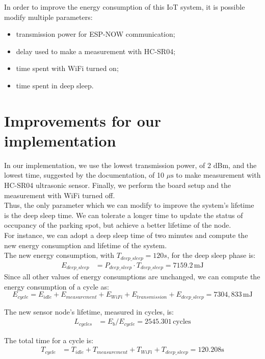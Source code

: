 In order to improve the energy consumption of this IoT system, it is possible modify multiple parameters:
\begin{itemize}
	\item transmission power for ESP-NOW communication;
	\item delay used to make a measurement with HC-SR04;
	\item time spent with WiFi turned on;
	\item time spent in deep sleep.
\end{itemize}

\section{Improvements for our implementation}
In our implementation, we use the lowest transmission power, of 2 dBm, and the lowest time, suggested by the documentation, of 10 $\mu \text{s}$ to make measurement with HC-SR04 ultrasonic sensor. Finally, we perform the board setup and the measurement with WiFi turned off.\\
Thus, the only parameter which we can modify to improve the system's lifetime is the deep sleep time. We can tolerate a longer time to update the status of occupancy of the parking spot, but achieve a better lifetime of the node.\\
For instance, we can adopt a deep sleep time of two minutes and compute the new energy consumption and lifetime of the system.\\
The new energy consumption, with $T_{deep\_sleep} = 120 s$,  for the deep sleep phase is:
\begin{align*}
   	E_{deep\_sleep} &= P_{deep\_sleep} \cdot T_{deep\_sleep} = 7159.2\,\text{mJ} 
\end{align*}
Since all other values of energy consumptions are unchanged, we can compute the energy consumption of a cycle as:
\[
E_{cycle} = E_{idle} + E_{measurement} + E_{WiFi} + E_{transmission} + E_{deep\_sleep} = 7304,833\,\text{mJ} 
\]

The new sensor node's lifetime, measured in cycles, is:
\begin{align*}
	L_{cycles}&= E_{b}/E_{cycle} = 2545.301 \,\text{cycles} 
\end{align*}

The total time for a cycle is:
\begin{align*}
	T_{cycle} &= T_{idle} + T_{measurement} + T_{WiFi} + T_{deep\_sleep} = 120.208 \text{s}
\end{align*}

